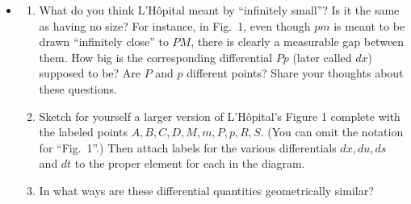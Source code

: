 \documentclass[11pt]{article}
\newcounter{tasknumb}
\newcommand{\tasknumb}[1]{\refstepcounter{tasknumb}\textmd{\textbf{$\fbox{$\fbox{Task \thetasknumb}$}$}}#1}
\newenvironment{task}[1][]%
 {\begin{itemize}
 \item[\tasknumb{#1}] }
{
    \end{itemize}    }%
\begin{document}
\begin{task}[\label{Differential}]
\begin{enumerate} \itemsep -10pt
\item[(a)] What do you think L'H\^opital meant by ``infinitely small''? Is it the same as having no size? For instance, in Fig.~1, even though $pm$ is meant to be drawn ``infinitely close'' to $PM$, there is clearly a measurable gap between them. How big is the corresponding differential $Pp$ (later called $dx$) supposed to be? Are $P$ and $p$ different points? Share your thoughts about these questions. \\
\item[(b)] Sketch for yourself a larger version of L'H\^opital's Figure 1 complete with the labeled points $A, B, C, D, M, m, P, p, R, S$. (You can omit the notation for ``Fig.~1''.) Then attach labels for the various differentials $dx, du, ds$ and $dt$ to the proper element for each in the diagram. \\
\item[(c)] In what ways are these differential quantities geometrically similar?
\end{enumerate}
\end{task}
\vspace{-0.25in}
\end{document}
